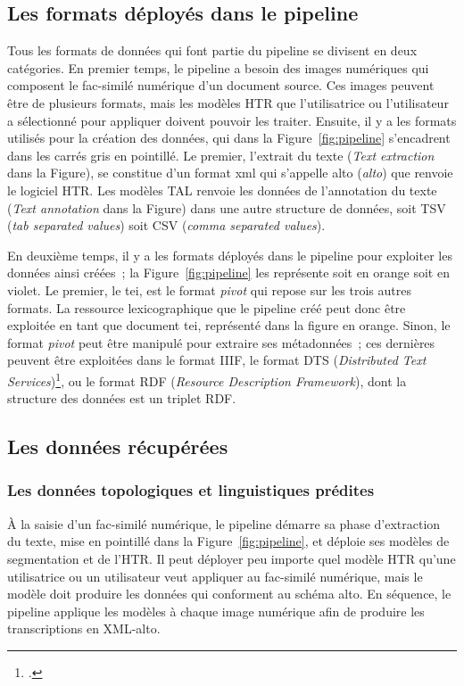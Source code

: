 \documentclass[class=article, crop=false]{standalone}
\begin{document}
\subsection{Les formats déployés dans le pipeline}
Tous les formats de données qui font partie du pipeline se divisent en deux catégories. En premier temps, le pipeline a besoin des images numériques qui composent le fac-similé numérique d'un document source. Ces images peuvent être de plusieurs formats, mais les modèles \acrshort{HTR} que l'utilisatrice ou l'utilisateur a sélectionné pour appliquer doivent pouvoir les traiter. Ensuite, il y a les formats utilisés pour la création des données, qui dans la Figure~\ref{fig:pipeline} s'encadrent dans les carrés gris en pointillé. Le premier, l'extrait du texte (\textit{Text extraction} dans la Figure), se constitue d'un format \acrshort{xml} qui s'appelle \acrshort{alto} (\textit{\acrlong{alto}}) que renvoie le logiciel \acrshort{HTR}. Les modèles \acrshort{TAL} renvoie les données de l'annotation du texte (\textit{Text annotation} dans la Figure) dans une autre structure de données, soit TSV (\textit{tab separated values}) soit CSV (\textit{comma separated values}).

En deuxième temps, il y a les formats déployés dans le pipeline pour exploiter les données ainsi créées~; la Figure~\ref{fig:pipeline} les représente soit en orange soit en violet. Le premier, le \acrshort{tei}, est le format \textit{pivot} qui repose sur les trois autres formats. La ressource lexicographique que le pipeline créé peut donc être exploitée en tant que document \acrshort{tei}, représenté dans la figure en orange. Sinon, le format \textit{pivot} peut être manipulé pour extraire ses métadonnées~; ces dernières peuvent être exploitées dans le format \acrshort{IIIF}, le format DTS (\textit{Distributed Text Services})\footcite{almasDistributedTextServices2021}, ou le format RDF (\textit{Resource Description Framework}), dont la structure des données est un triplet RDF.

\subsection{Les données récupérées}

\subsubsection{Les données topologiques et linguistiques prédites}
À la saisie d'un fac-similé numérique, le pipeline démarre sa phase d'extraction du texte, mise en pointillé dans la Figure~\ref{fig:pipeline}, et déploie ses modèles de segmentation et de l'\acrshort{HTR}. Il peut déployer peu importe quel modèle \acrshort{HTR} qu'une utilisatrice ou un utilisateur veut appliquer au fac-similé numérique, mais le modèle doit produire les données qui conforment au schéma \acrshort{alto}. En séquence, le pipeline applique les modèles à chaque image numérique afin de produire les transcriptions en XML-\acrshort{alto}.
\end{document}
